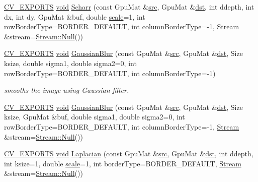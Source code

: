 \begin{DoxyCompactItemize}
\hyperlink{core_2types__c_8h_a1bf9f0e121b54272da02379cfccd0a2b}{C\-V\-\_\-\-E\-X\-P\-O\-R\-T\-S} \hyperlink{legacy_8hpp_a8bb47f092d473522721002c86c13b94e}{void} \hyperlink{namespacecv_1_1gpu_aed5e7ec7099afdc8e947036c3c9c4bc1}{Scharr} (const Gpu\-Mat \&\hyperlink{legacy_8hpp_a371cd109b74033bc4366f584edd3dacc}{src}, Gpu\-Mat \&\hyperlink{photo__c_8h_aed13e2a25279b24dc954073233fef7a5}{dst}, int ddepth, int dx, int dy, Gpu\-Mat \&buf, double \hyperlink{objdetect_8hpp_a1f622eb9b9e06b30862ca90cdf2c078b}{scale}=1, int row\-Border\-Type=B\-O\-R\-D\-E\-R\-\_\-\-D\-E\-F\-A\-U\-L\-T, int column\-Border\-Type=-\/1, \hyperlink{classcv_1_1gpu_1_1Stream}{Stream} \&stream=\hyperlink{classcv_1_1gpu_1_1Stream_af96c23564834f88333dcb8997df553f1}{Stream\-::\-Null}())
\item 
\hyperlink{core_2types__c_8h_a1bf9f0e121b54272da02379cfccd0a2b}{C\-V\-\_\-\-E\-X\-P\-O\-R\-T\-S} \hyperlink{legacy_8hpp_a8bb47f092d473522721002c86c13b94e}{void} \hyperlink{namespacecv_1_1gpu_ab079e73b27591b4df3f87c8417a62139}{Gaussian\-Blur} (const Gpu\-Mat \&\hyperlink{legacy_8hpp_a371cd109b74033bc4366f584edd3dacc}{src}, Gpu\-Mat \&\hyperlink{photo__c_8h_aed13e2a25279b24dc954073233fef7a5}{dst}, Size ksize, double sigma1, double sigma2=0, int row\-Border\-Type=B\-O\-R\-D\-E\-R\-\_\-\-D\-E\-F\-A\-U\-L\-T, int column\-Border\-Type=-\/1)
\begin{DoxyCompactList}\small\item\em smooths the image using Gaussian filter. \end{DoxyCompactList}\item 
\hyperlink{core_2types__c_8h_a1bf9f0e121b54272da02379cfccd0a2b}{C\-V\-\_\-\-E\-X\-P\-O\-R\-T\-S} \hyperlink{legacy_8hpp_a8bb47f092d473522721002c86c13b94e}{void} \hyperlink{namespacecv_1_1gpu_a22a236f0e10b500cea0e843398d9adf6}{Gaussian\-Blur} (const Gpu\-Mat \&\hyperlink{legacy_8hpp_a371cd109b74033bc4366f584edd3dacc}{src}, Gpu\-Mat \&\hyperlink{photo__c_8h_aed13e2a25279b24dc954073233fef7a5}{dst}, Size ksize, Gpu\-Mat \&buf, double sigma1, double sigma2=0, int row\-Border\-Type=B\-O\-R\-D\-E\-R\-\_\-\-D\-E\-F\-A\-U\-L\-T, int column\-Border\-Type=-\/1, \hyperlink{classcv_1_1gpu_1_1Stream}{Stream} \&stream=\hyperlink{classcv_1_1gpu_1_1Stream_af96c23564834f88333dcb8997df553f1}{Stream\-::\-Null}())
\item 
\hyperlink{core_2types__c_8h_a1bf9f0e121b54272da02379cfccd0a2b}{C\-V\-\_\-\-E\-X\-P\-O\-R\-T\-S} \hyperlink{legacy_8hpp_a8bb47f092d473522721002c86c13b94e}{void} \hyperlink{namespacecv_1_1gpu_ae4a4934d0c077a196d764c3dcf787283}{Laplacian} (const Gpu\-Mat \&\hyperlink{legacy_8hpp_a371cd109b74033bc4366f584edd3dacc}{src}, Gpu\-Mat \&\hyperlink{photo__c_8h_aed13e2a25279b24dc954073233fef7a5}{dst}, int ddepth, int ksize=1, double \hyperlink{objdetect_8hpp_a1f622eb9b9e06b30862ca90cdf2c078b}{scale}=1, int border\-Type=B\-O\-R\-D\-E\-R\-\_\-\-D\-E\-F\-A\-U\-L\-T, \hyperlink{classcv_1_1gpu_1_1Stream}{Stream} \&stream=\hyperlink{classcv_1_1gpu_1_1Stream_af96c23564834f88333dcb8997df553f1}{Stream\-::\-Null}())

\end{DoxyCompactItemize}
